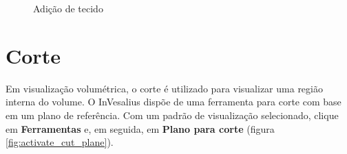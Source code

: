 \begin{figure}[!htb]
  \centering
  \hfill
  \hfill  
  \caption{Adição de tecido}
  \label{fig:raycasting_add}
\end{figure}

\newpage


\section{Corte}

Em visualização volumétrica, o corte é utilizado para visualizar uma região interna do volume.
O InVesalius dispõe de uma ferramenta para corte com base em um plano de referência. Com
um padrão de visualização selecionado, clique em \textbf{Ferramentas} e, em seguida, em
\textbf{Plano para corte} (figura \ref{fig:activate_cut_plane}).

